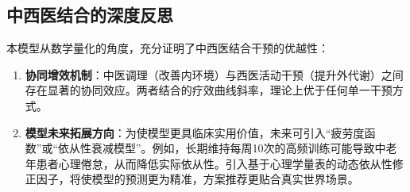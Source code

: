 \documentclass[12pt,a4paper]{article}
\begin{document}
\subsection{中西医结合的深度反思}
本模型从数学量化的角度，充分证明了中西医结合干预的优越性：
\begin{enumerate}
    \item \textbf{协同增效机制}：中医调理（改善内环境）与西医活动干预（提升外代谢）之间存在显著的协同效应。两者结合的疗效曲线斜率，理论上优于任何单一干预方式。
    \item \textbf{模型未来拓展方向}：为使模型更具临床实用价值，未来可引入“疲劳度函数”或“依从性衰减模型”。例如，长期维持每周10次的高频训练可能导致中老年患者心理倦怠，从而降低实际依从性。引入基于心理学量表的动态依从性修正因子，将使模型的预测更为精准，方案推荐更贴合真实世界场景。
\end{enumerate}
\end{document}
